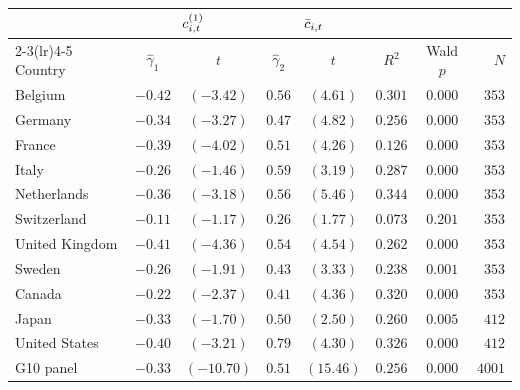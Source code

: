 \small
\begin{tabular}{l cc cc c c r}
  \toprule
  & \multicolumn{2}{c}{$c^{(1)}_{i,t}$} & \multicolumn{2}{c}{$\bar{c}_{i,t}$} & & & \\
  \cmidrule(lr){2-3}\cmidrule(lr){4-5}
  Country & $\hat{\gamma}_{1}$ & $t$ & $\hat{\gamma}_{2}$ & $t$ & $R^{2}$ & Wald $p$ & $N$ \\
  \midrule
  Belgium     & $-0.42$ & $(-3.42)$ & $0.56$ & $(4.61)$  & $0.301$ & $0.000$ & $353$ \\
  Germany     & $-0.34$ & $(-3.27)$ & $0.47$ & $(4.82)$  & $0.256$ & $0.000$ & $353$ \\
  France      & $-0.39$ & $(-4.02)$ & $0.51$ & $(4.26)$  & $0.126$ & $0.000$ & $353$ \\
  Italy       & $-0.26$ & $(-1.46)$ & $0.59$ & $(3.19)$  & $0.287$ & $0.000$ & $353$ \\
  Netherlands & $-0.36$ & $(-3.18)$ & $0.56$ & $(5.46)$  & $0.344$ & $0.000$ & $353$ \\
  Switzerland & $-0.11$ & $(-1.17)$ & $0.26$ & $(1.77)$  & $0.073$ & $0.201$ & $353$ \\
  United Kingdom & $-0.41$ & $(-4.36)$ & $0.54$ & $(4.54)$ & $0.262$ & $0.000$ & $353$ \\
  Sweden      & $-0.26$ & $(-1.91)$ & $0.43$ & $(3.33)$  & $0.238$ & $0.001$ & $353$ \\
  Canada      & $-0.22$ & $(-2.37)$ & $0.41$ & $(4.36)$  & $0.320$ & $0.000$ & $353$ \\
  Japan       & $-0.33$ & $(-1.70)$ & $0.50$ & $(2.50)$  & $0.260$ & $0.005$ & $412$ \\
  United States & $-0.40$ & $(-3.21)$ & $0.79$ & $(4.30)$ & $0.326$ & $0.000$ & $412$ \\
  \midrule
  G10 panel   & $-0.33$ & $(-10.70)$ & $0.51$ & $(15.46)$ & $0.256$ & $0.000$ & $4001$ \\
  \bottomrule
\end{tabular}
